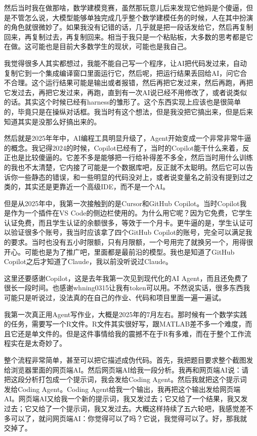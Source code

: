 然后当时我在做那啥，数学建模竞赛，虽然那玩意儿后来发现它他妈是个傻逼，但是不管怎么说，大模型能够单独完成几乎整个数学建模任务的时候，人在其中扮演的角色就很微妙了。如果我没有记错的话，几乎就是把一段话发给它，然后再复制回来，再复制过去，再复制回来。相当于我只是一个粘贴板，大多数的思考都是它在做。这可能也是目前大多数学生的现状，可能也是我自己。

我觉得很多人其实都想过，我能不能自己写一个程序，让AI把代码发过来，自动复制它到一个集成编译窗口里面运行它，然后呢，把运行结果丢回给AI，问它合不合理。这个运行结果可能是输出或者报错，然后再把它发过来，然后再跑，再把它发过去，再把它发过来，再跑，直到有一次AI说已经不用修改了，或者说类似的话。其实这个时候已经有harness的雏形了。这个东西实现上应该也是很简单的，毕竟只是在操纵对话框。我当时有这个想法，但是我没把它搞出来，但是后来知道其实是没那么好搞出来的。

然后就是2025年年中，AI编程工具明显升级了，Agent开始变成一个非常非常牛逼的概念。我记得2024的时候，Copilot已经有了，当时的Copilot能干什么来着，反正也是比较傻逼的。它差不多是能够把一行给补得差不多全，然后当时用什么训练的我也不太清楚，它内接了可能是一个数据库吧，反正就不太聪明。然后它可以告诉你一些静态的错误，和一些明显的代码没对上，或者说变量名之前没有提到过之类的，其实还是更靠近一个高级IDE，而不是一个AI。

但是从2025年中，我第一次接触到的是Cursor和GitHub Copilot。当时Copilot我是作为一个插件在VS Code的侧边栏使用的。为什么用它呢？因为它免费，它学生认证免费，而且学生认证的余额很多，等效于一个月卡。更牛逼的是，学生认证可以验证很多个账号，我当时应该拿了四个GitHub Copilot的账号，完全可以满足我的要求。当时也没有五小时限额，只有月限额，一个号用完了就换另一个，用得很开心。可能也是为了推广吧，里面都是最前沿的模型。我也是知道了GitHub Copilot之后才知道了Claude，我以前没听说过Claude。

这里还要感谢Copilot，这是去年我第一次见到现代化的AI Agent，而且还免费了很长一段时间。也感谢whning0315让我有token可以用。不然说实话，很多东西我可能只是听说过，没法真的在自己的作业、代码和项目里面一遍一遍试。

我第一次真正用Agent写作业，大概是2025年的7月左右。那时候有一个数学实践的任务，需要写一个R文件。R文件其实很好写，跟MATLAB差不多一个难度，而且它还是单文件的。但是这件事情给我的震撼不在于R有多难，而在于整个工作流程实在是太奇妙了。

整个流程非常简单，甚至可以把它描述成伪代码。首先，我把题目要求整个截图发给浏览器里面的网页端AI。然后网页端AI给我一段分析。我再和网页端AI说：请把这段分析打包成一个提示词，我会发给Coding Agent。然后我就把这个提示词发给Coding Agent。Coding Agent给我一个输出，我再把这个输出发给网页端AI。网页端AI又给我一个新的提示词，我又发过去；它又给了一个结果，我又发过去；它又给了一个提示词，我又发过去。大概这样持续了五六轮吧，我感觉差不多可以了，就问网页端AI：你觉得可以了吗？它说，我觉得可以了。好，那我就交掉了。

